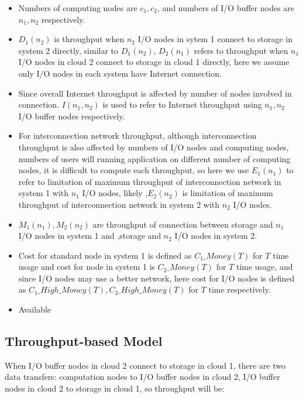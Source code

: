 \documentclass[JIP,draft]{ipsj}
\begin{document}
\begin{itemize}
	\item Numbers of computing nodes are $c_1,c_2$, and numbers of I/O buffer nodes are $n_1, n_2$ respectively.
	\item $D_1(n_2)$ is throughput when $n_2$ I/O nodes in sytem 1 connect to storage in system 2 directly, similar to $D_1(n_2)$, $D_2(n_1)$ refers to throughput when $n_1$ I/O nodes in cloud 2 connect to storage in cloud 1 directly, here we assume only I/O nodes in each system have Internet connection.
	\item Since overall Internet throughput is affected by number of nodes involved in connection. $I(n_1,n_2)$ is used to refer to Internet throughput using $n_1,n_2$ I/O buffer nodes respectively.
	\item For interconnection network throughput, although interconnection throughput is also affected by numbers of I/O nodes and computing nodes, numbers of users will running application on different number of computing nodes, it is difficult to compute each throughput, so here we use $E_1(n_1)$ to refer to limitation of maximum throughput of interconnection network in system 1 with $n_1$ I/O nodes, likely ,$E_2(n_2)$ is limitation of maximum throughput of interconnection network in system 2 with $n_2$ I/O nodes.
	\item $M_1(n_1),M_2(n_2)$ are throughput of connection between storage and $n_1$ I/O nodes in system 1 and ,storage and $n_2$ I/O nodes in system 2.
	\item Cost for standard node in system 1 is defined as $C_1\_Money(T)$ for $T$ time usage and cost for node in system 1 is $C_2\_Money(T)$ for $T$ time usage, and since I/O nodes may use a better network, here cost for I/O nodes is defined as $C_1\_High\_Money(T),C_2\_High\_Money(T)$ for $T$ time respectively.
	\item Available 
\end{itemize}

\subsection{Throughput-based Model}
When I/O buffer nodes in cloud 2 connect to storage in cloud 1, there are two data transfers: computation nodes to I/O buffer nodes in cloud 2, I/O buffer nodes in cloud 2 to storage in cloud 1, so throughput will be:
\end{document}
